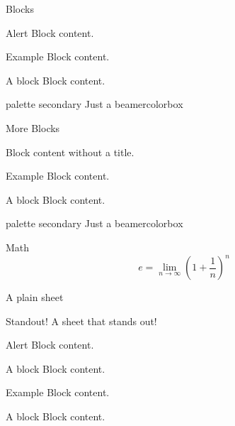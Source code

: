 \documentclass[12pt, dutch]{beamer}
\begin{document}
\begin{frame}{Blocks}
    \begin{alertblock}{Alert}
        Block content.
      \end{alertblock}
      \begin{exampleblock}{Example}
        Block content.
       \end{exampleblock} 
      \begin{block}{A block}
        Block content.
       \end{block}        
\begin{beamercolorbox}[wd=\linewidth, ht=2.5ex, dp=1.125ex,center]{palette secondary}
Just a beamercolorbox 
\end{beamercolorbox}
           
\end{frame}

\begin{frame}{More Blocks}
    \begin{alertblock}{}
        Block content without a title.
      \end{alertblock}
      \begin{exampleblock}{Example}
        Block content.
       \end{exampleblock} 
      \begin{block}{A block}
        Block content.
       \end{block}        
\begin{beamercolorbox}[wd=\linewidth, ht=2.5ex, dp=1.125ex,center]{palette secondary}
Just a beamercolorbox 
\end{beamercolorbox}
           
\end{frame}

\begin{frame}{Math}
  \begin{equation*}
    e = \lim_{n\to \infty} \left(1 + \frac{1}{n}\right)^n
  \end{equation*}
\end{frame}

\begin{frame}[plain]
  A plain sheet
\end{frame}
 
\begin{frame}[standout]{Standout!}
  A sheet that stands out!
  \begin{alertblock}{Alert}
        Block content.
      \end{alertblock}
         \begin{block}{A block}
        Block content.
       \end{block} 
      \begin{exampleblock}{Example}
        Block content.
       \end{exampleblock} 
      \begin{block}{A block}
        Block content.
       \end{block}        
\end{frame} 
\end{document}
